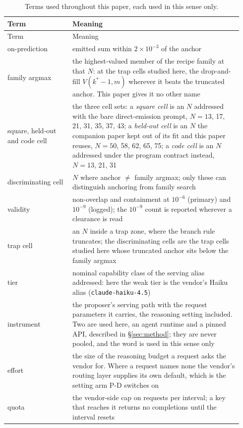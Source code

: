\begin{footnotesize}
\setlength{\tabcolsep}{3.5pt}
\begin{longtable}{@{}p{0.26\linewidth}p{0.68\linewidth}@{}}
\caption{Terms used throughout this paper, each used in this sense only.}
\label{tab:glossary} \\
\toprule
Term & Meaning \\
\midrule
\endfirsthead
\toprule
Term & Meaning \\
\midrule
\endhead
on-prediction & emitted sum within $2\times10^{-3}$ of the anchor \\
family argmax & the highest-valued member of the recipe family at that $N$: at the trap cells studied here, the drop-and-fill $V(k^*{-}1, m)$ wherever it beats the truncated anchor. This paper gives it no other name \\
square, held-out and code cell & the three cell sets: a \emph{square cell} is an $N$ addressed with the bare direct-emission prompt, $N = 13$, 17, 21, 31, 35, 37, 43; a \emph{held-out cell} is an $N$ the companion paper kept out of its fit and this paper reuses, $N = 50$, 58, 62, 65, 75; a \emph{code cell} is an $N$ addressed under the program contract instead, $N = 13$, 21, 31 \\
discriminating cell & $N$ where anchor $\ne$ family argmax; only these can distinguish anchoring from family search \\
validity & non-overlap and containment at $10^{-6}$ (primary) and $10^{-9}$ (logged); the $10^{-9}$ count is reported wherever a clearance is read \\
trap cell & an $N$ inside a trap zone, where the branch rule truncates; the discriminating cells are the trap cells studied here whose truncated anchor sits below the family argmax \\
tier & nominal capability class of the serving alias addressed: here the weak tier is the vendor's Haiku alias (\texttt{claude-haiku-4.5}) \\
instrument & the proposer's serving path with the request parameters it carries, the reasoning setting included. Two are used here, an agent runtime and a pinned API, described in \S\ref{sec:method}; they are never pooled, and the word is used in this sense only \\
effort & the size of the reasoning budget a request asks the vendor for. Where a request names none the vendor's routing layer supplies its own default, which is the setting arm P-D switches on \\
quota & the vendor-side cap on requests per interval; a key that reaches it returns no completions until the interval resets \\

\end{longtable}
\end{footnotesize}
